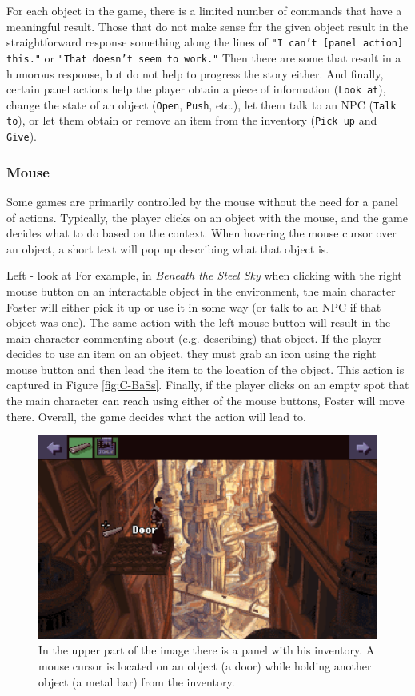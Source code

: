 For each object in the game, there is a limited number of commands that have a meaningful result. Those that do not make sense for the given object result in the straightforward response something along the lines of \texttt{"I can't [panel action] this."} or \texttt{"That doesn't seem to work."} Then there are some that result in a humorous response, but do not help to progress the story either. And finally, certain panel actions help the player obtain a piece of information (\texttt{Look at}), change the state of an object (\texttt{Open}, \texttt{Push}, etc.), let them talk to an NPC (\texttt{Talk to}), or let them obtain or remove an item from the inventory (\texttt{Pick up} and \texttt{Give}).

\subsubsection{Mouse}
Some games are primarily controlled by the mouse without the need for a panel of actions. Typically, the player clicks on an object with the mouse, and the game decides what to do based on the context. When hovering the mouse cursor over an object, a short text will pop up describing what that object is.

Left - look at
For example, in \textit{Beneath the Steel Sky} when clicking with the right mouse button on an interactable object in the environment, the main character Foster will either pick it up or use it in some way (or talk to an NPC if that object was one). The same action with the left mouse button will result in the main character commenting about (e.g. describing) that object. If the player decides to use an item on an object, they must grab an icon using the right mouse button and then lead the item to the location of the object. This action is captured in Figure \ref{fig:C-BaSs}. Finally, if the player clicks on an empty spot that the main character can reach using either of the mouse buttons, Foster will move there. Overall, the game decides what the action will lead to.

\begin{figure}[H]
\centering
\includegraphics[width=1.\linewidth]{img/C-BaSS.png}
\caption{In the upper part of the image there is a panel with his inventory. A mouse cursor is located on an object (a door) while holding another object (a metal bar) from the inventory.}
\label{fig:C-BaSS}
\end{figure}

